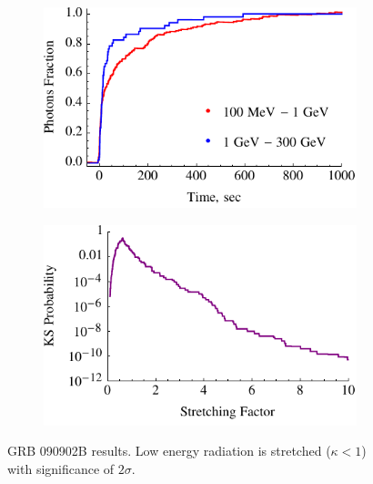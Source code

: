 \documentclass{article}
\begin{document}
\begin{figure}
        \centering
        \begin{subfigure}{0.49\textwidth}
                \includegraphics[width=\textwidth]{lightCurve090902B}
                \label{fig:lightCurve090902B}
        \end{subfigure}
        \begin{subfigure}{0.49\textwidth}
                \includegraphics[width=\textwidth]{probabilities090902B}
                \label{fig:probabilities090902B}
        \end{subfigure}
        \caption{GRB 090902B results. Low energy radiation is stretched ($\kappa < 1$) with significance of $2\sigma$.}
        \label{fig:grb090902B}
\end{figure}
\end{document}
